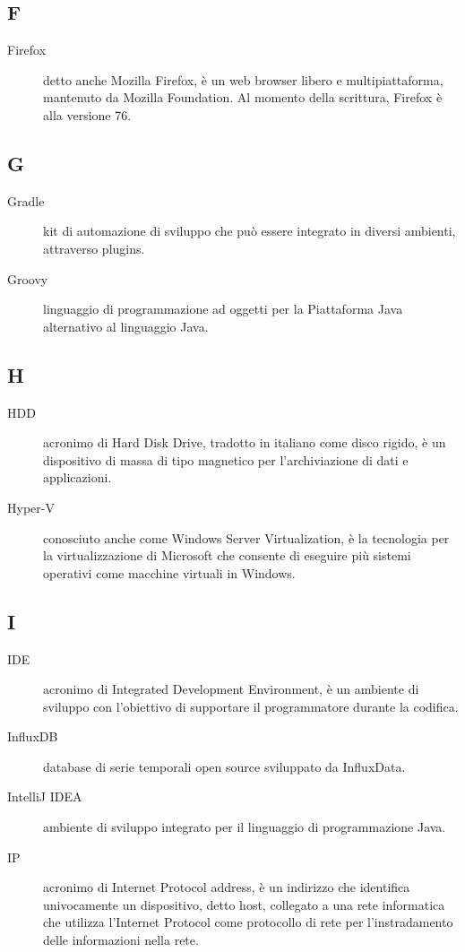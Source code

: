 \documentclass[../../../manuale.sviluppatore.tex]{subfiles}
\begin{document}
\subsection{F}

\begin{description}
  \item[Firefox] detto anche Mozilla Firefox, è un web browser libero e multipiattaforma, mantenuto da Mozilla Foundation. Al momento della scrittura, Firefox è alla versione 76.
\end{description}

\subsection{G}

\begin{description}
    \item[Gradle] kit di automazione di sviluppo che può essere integrato in diversi ambienti, attraverso plugins.
    \item[Groovy] linguaggio di programmazione ad oggetti per la Piattaforma Java alternativo al linguaggio Java.
\end{description}

\subsection{H}

\begin{description}
  \item[HDD] acronimo di Hard Disk Drive, tradotto in italiano come disco rigido, è un dispositivo di massa di tipo magnetico per l'archiviazione di dati e applicazioni.
  \item[Hyper-V] conosciuto anche come Windows Server Virtualization, è la tecnologia per la virtualizzazione di Microsoft che consente di eseguire più sistemi operativi come macchine virtuali in Windows.
\end{description}

\subsection{I}

\begin{description}
    \item[IDE] acronimo di Integrated Development Environment, è un ambiente di sviluppo con l'obiettivo di supportare il programmatore durante la codifica.
    \item[InfluxDB] database di serie temporali open source sviluppato da InfluxData.
    \item[IntelliJ IDEA] ambiente di sviluppo integrato per il linguaggio di programmazione Java.
    \item[IP] acronimo di Internet Protocol address, è un indirizzo che identifica univocamente un dispositivo, detto host, collegato a una rete informatica che utilizza l'Internet Protocol come protocollo di rete per l'instradamento delle informazioni nella rete.
\end{description}
\end{document}
